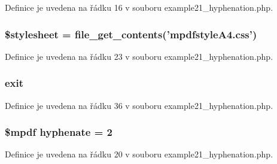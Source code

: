Definice je uvedena na řádku 16 v souboru example21\-\_\-hyphenation.\-php.

\hypertarget{example21__hyphenation_8php_a19e5cf73e817c55a49205e6ec78c88a8}{
\subsubsection[{\$stylesheet}]{\setlength{\rightskip}{0pt plus 5cm}\$stylesheet = file\-\_\-get\-\_\-contents('mpdfstyle\-A4.\-css')}}\label{example21__hyphenation_8php_a19e5cf73e817c55a49205e6ec78c88a8}


Definice je uvedena na řádku 23 v souboru example21\-\_\-hyphenation.\-php.

\hypertarget{example21__hyphenation_8php_a6733eb5f605d09eaede9845835d71c4e}{
\subsubsection[{exit}]{\setlength{\rightskip}{0pt plus 5cm}exit}}\label{example21__hyphenation_8php_a6733eb5f605d09eaede9845835d71c4e}


Definice je uvedena na řádku 36 v souboru example21\-\_\-hyphenation.\-php.

\hypertarget{example21__hyphenation_8php_a988e0360138a1001f27d70c65256d100}{
\subsubsection[{hyphenate}]{\setlength{\rightskip}{0pt plus 5cm}\$mpdf hyphenate = 2}}\label{example21__hyphenation_8php_a988e0360138a1001f27d70c65256d100}


Definice je uvedena na řádku 20 v souboru example21\-\_\-hyphenation.\-php.


